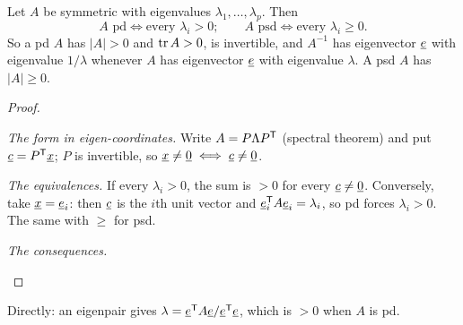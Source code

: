 \begin{theorem}
Let $A$ be symmetric with eigenvalues $\lambda_1,\dots,\lambda_p$. Then
\[
  \boxed{\;A\text{ pd}\iff\text{every }\lambda_i>0;\qquad A\text{ psd}\iff\text{every }\lambda_i\ge0.\;}
\]
So a pd $A$ has $|A|>0$ and $\operatorname{tr} A>0$, is invertible, and $A^{-1}$ has eigenvector $\underline{e}$ with eigenvalue $1/\lambda$ whenever $A$ has eigenvector $\underline{e}$ with eigenvalue $\lambda$. A psd $A$ has $|A|\ge0$.
\end{theorem}
\begin{proof}
\begin{steps}
  \item \emph{The form in eigen-coordinates.} Write $A=P\Lambda P^{\mathsf{T}}$ (spectral theorem) and put $\underline{c}=P^{\mathsf{T}}\underline{x}$; $P$ is invertible, so $\underline{x}\ne\underline{0}\iff\underline{c}\ne\underline{0}$.
  \begin{deriv}
  \end{deriv}
  \item \emph{The equivalences.} If every $\lambda_i>0$, the sum is $>0$ for every $\underline{c}\ne\underline{0}$. Conversely, take $\underline{x}=\underline{e}_i$: then $\underline{c}$ is the $i$th unit vector and $\underline{e}_i^{\mathsf{T}} A\underline{e}_i=\lambda_i$, so pd forces $\lambda_i>0$. The same with $\ge$ for psd.
  \item \emph{The consequences.}
  \begin{deriv}
  \end{deriv}
\end{steps}
\end{proof}
Directly: an eigenpair gives $\lambda=\underline{e}^{\mathsf{T}} A\underline{e}/\underline{e}^{\mathsf{T}}\underline{e}$, which is $>0$ when $A$ is pd.

